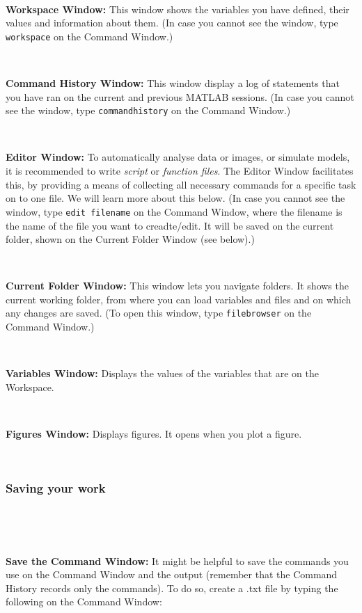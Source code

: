 \documentclass[11pt]{amsart}
\begin{document}
\

{\bf Workspace Window:} This window shows the variables you have defined, their values and information about them. (In case you cannot see the window, type \verb+workspace+ on the Command Window.) 

\

{\bf Command History Window:} This window display a log of statements that you have ran on the current and previous MATLAB sessions. (In case you cannot see the window, type  \verb+commandhistory+ on the Command Window.)

\

{\bf Editor Window:} To automatically analyse data or images, or simulate models, it is recommended to write {\it script} or {\it function files}. The Editor Window facilitates this, by providing a means of collecting all necessary commands for a specific task on to one file. We will learn more about this below. (In case you cannot see the window, type  \verb+edit filename+ on the Command Window, where the filename is the name of the file you want to creadte/edit. It will be saved on the current folder, shown on the Current Folder Window (see below).)

\

{\bf Current Folder Window:} This window lets you navigate folders. It shows the current working folder, from where you can load variables and files and on which any changes are saved. (To open this window, type  \verb+filebrowser+ on the Command Window.)

\

{\bf Variables Window:} Displays the values of the variables that are on the Workspace.

\

{\bf Figures Window:} Displays figures. It opens when you plot a figure.

\

\subsubsection{Saving your work}

\

\

{\bf Save the Command Window:} It might be helpful to save the commands you use on the Command Window and the output (remember that the Command History records only the commands). To do so, create a .txt file by typing the following on the Command Window:

\
\end{document}
